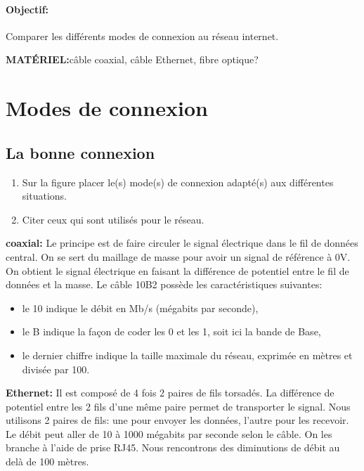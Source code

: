 \documentclass[a4paper,11pt]{article}
\begin{document}
\begin{Form}
\paragraph{Objectif:}Comparer les différents modes de connexion au réseau internet.
\begin{commentprof}
\textbf{MATÉRIEL:}câble coaxial, câble Ethernet, fibre optique?
\end{commentprof}
\section{Modes de connexion}
\subsection{La bonne connexion}
\begin{enumerate}
\item Sur la figure placer le(s) mode(s) de connexion adapté(s) aux différentes situations.
\item Citer ceux qui sont utilisés pour le réseau.
\end{enumerate}
\begin{framed}
\textbf{coaxial:} Le principe est de faire circuler le signal électrique dans le fil de données central. On se sert du maillage de masse pour avoir un signal de référence à 0V. On obtient le signal électrique en faisant la différence de potentiel entre le fil de données et la masse. Le câble 10B2 possède les caractéristiques suivantes:
\begin{itemize}
\item le 10 indique le débit en Mb/s (mégabits par seconde),
\item le B indique la façon de coder les 0 et les 1, soit ici la bande de Base,
\item le dernier chiffre indique la taille maximale du réseau, exprimée en mètres et divisée par 100.
\end{itemize}
\end{framed}
\begin{framed}
\textbf{Ethernet:} Il est composé de 4 fois 2 paires de fils torsadés. La différence de potentiel entre les 2 fils d'une même paire permet de transporter le signal. Nous utilisons 2 paires de fils: une pour envoyer les données, l'autre pour les recevoir. Le débit peut aller de 10 à 1000 mégabits par seconde selon le câble. On les branche à l'aide de prise RJ45. Nous rencontrons des diminutions de débit au delà de 100 mètres.

\end{framed}
\end{Form}
\end{document}
